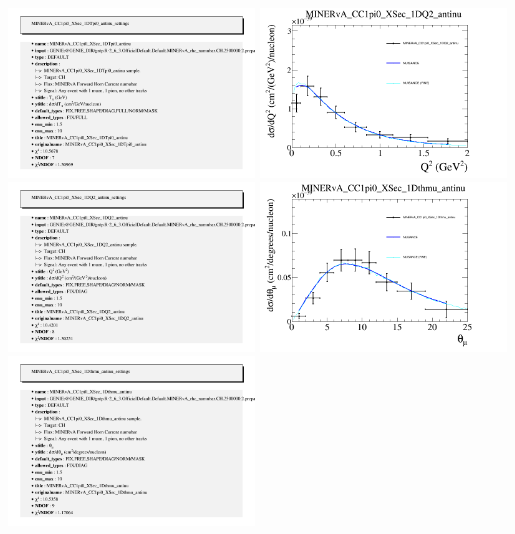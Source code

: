 \documentclass{article}
\begin{document}
\includegraphics[width=0.49\textwidth]{figures/nuisance_MINERvA_CC1pi0_XSec_1DTpi0_antinu_info.png}
\centering
\includegraphics[width=0.49\textwidth]{figures/nuisance_MINERvA_CC1pi0_XSec_1DQ2_antinu_comp.png}
\includegraphics[width=0.49\textwidth]{figures/nuisance_MINERvA_CC1pi0_XSec_1DQ2_antinu_info.png}
\centering
\includegraphics[width=0.49\textwidth]{figures/nuisance_MINERvA_CC1pi0_XSec_1Dthmu_antinu_comp.png}
\includegraphics[width=0.49\textwidth]{figures/nuisance_MINERvA_CC1pi0_XSec_1Dthmu_antinu_info.png}
\end{document}
